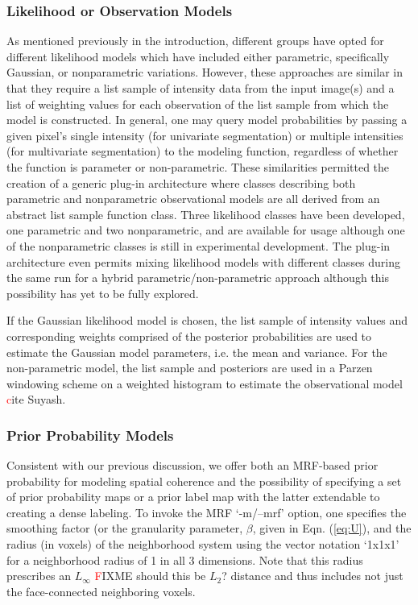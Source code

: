 \documentclass[11pt,english]{article}
\begin{document}
 \subsubsection{Likelihood or Observation Models}
As mentioned previously in the introduction, different groups have opted for different likelihood models which have included
either parametric, specifically Gaussian, or nonparametric variations.  However, these approaches are similar in that 
they require a list sample of intensity data from the input image(s) and a list of weighting values for each observation 
of the list sample from which the model is constructed.  
In general, one may query model probabilities by passing a given pixel's single intensity (for univariate segmentation) or multiple intensities (for multivariate
segmentation) to the modeling function, regardless of whether the
function is parameter or non-parametric.  These similarities permitted the creation of a generic plug-in architecture
where classes describing both parametric and nonparametric  observational models are all derived from an abstract 
list sample function class.   Three likelihood classes have been developed, one parametric and two nonparametric,
and are available for usage although one of the nonparametric classes is still in experimental development.  The plug-in architecture even permits mixing likelihood models with different classes during the same run for a hybrid parametric/non-parametric approach although this possibility has yet to be fully explored.

If the Gaussian likelihood model is chosen, the list sample of intensity values and 
corresponding weights comprised of the posterior probabilities are used to estimate the Gaussian model parameters, i.e.
the mean and variance.  For the non-parametric model, the list sample and posteriors are used
in a Parzen windowing scheme on a weighted histogram to estimate the
observational model  {\textcolor{red} cite Suyash}.  

\subsubsection{Prior Probability Models}
Consistent with our previous discussion, we offer both an MRF-based
prior probability for modeling spatial coherence and the possibility
of specifying a set of prior probability maps or a prior label map
with the latter extendable to creating a dense labeling.  To invoke
the MRF `{\ttfamily -m/--mrf}' option, one specifies the smoothing
factor (or the granularity parameter, $\beta$, given in
Eqn. (\ref{eq:U}), and the radius (in voxels) of the neighborhood
system using the vector notation `{\ttfamily 1x1x1}' for a
neighborhood radius of 1 in all 3 dimensions.  Note that this radius
prescribes an $L_\infty$  {\textcolor{red} FIXME should this be $L_2$?} distance and thus includes not just the face-connected neighboring voxels.
\end{document}
